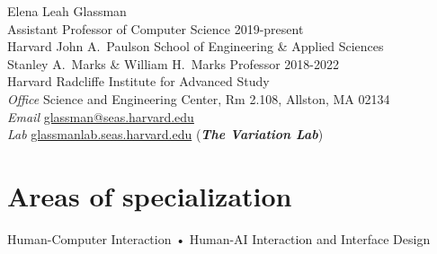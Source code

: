 \documentclass[10pt, a4paper]{article}
\begin{document}
{\LARGE Elena Leah Glassman}\\[0.25cm]
{\large Assistant Professor of Computer Science \hfill 2019-present\\ 
Harvard John A.~Paulson School of Engineering \& Applied Sciences\\
[0.1cm]
Stanley A.~Marks \& William H.~Marks Professor \hfill 2018-2022 \\
Harvard Radcliffe Institute for Advanced Study}\\[0.4cm]
\textit{Office} Science and Engineering Center, Rm 2.108, Allston, MA 02134\\%
\textit{Email} \href{mailto:glassman@seas.harvard.edu}{glassman@seas.harvard.edu} \\
\textit{Lab} \href{http://glassmanlab.seas.harvard.edu/}{glassmanlab.seas.harvard.edu} (\textit{\textbf{The Variation Lab}})

\section*{Areas of specialization}
Human-Computer Interaction • Human-AI Interaction and Interface Design
\end{document}
